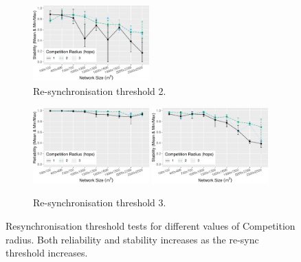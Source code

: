 \begin{figure}[H]
\begin{subfigure}{\textwidth}
    \includegraphics[width=0.49\textwidth, keepaspectratio]{figure/Results/ParameterEvaluation/ResyncThreshold2_Stability.pdf}
    \caption{Re-synchronisation threshold 2.}
    \label{subfig:resync-treshold-2}
\end{subfigure}
\begin{subfigure}{\textwidth}
    \centering
    \includegraphics[width=0.49\textwidth, keepaspectratio]{figure/Results/ParameterEvaluation/ResyncThreshold3_Reliability.pdf}
    \includegraphics[width=0.49\textwidth, keepaspectratio]{figure/Results/ParameterEvaluation/ResyncThreshold3_Stability.pdf}
    \caption{Re-synchronisation threshold 3.}
    \label{subfig:resync-treshold-3}
\end{subfigure}

    \caption{Resynchronisation threshold tests for different values of Competition radius. Both reliability and stability increases as the re-sync threshold increases.}
    \label{fig:resync-treshold-tests}
\end{figure}


